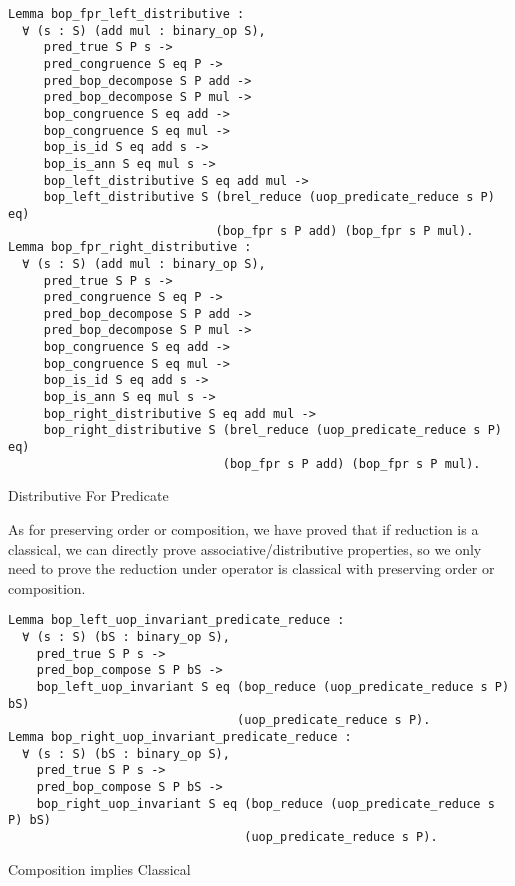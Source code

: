 \begin{listing}[H]
\begin{verbatim}
Lemma bop_fpr_left_distributive :
  ∀ (s : S) (add mul : binary_op S),
     pred_true S P s -> 
     pred_congruence S eq P ->
     pred_bop_decompose S P add ->
     pred_bop_decompose S P mul ->          
     bop_congruence S eq add ->     
     bop_congruence S eq mul -> 
     bop_is_id S eq add s ->     
     bop_is_ann S eq mul s ->
     bop_left_distributive S eq add mul ->
     bop_left_distributive S (brel_reduce (uop_predicate_reduce s P) eq) 
                             (bop_fpr s P add) (bop_fpr s P mul).
Lemma bop_fpr_right_distributive :
  ∀ (s : S) (add mul : binary_op S),
     pred_true S P s -> 
     pred_congruence S eq P ->
     pred_bop_decompose S P add ->
     pred_bop_decompose S P mul ->          
     bop_congruence S eq add ->     
     bop_congruence S eq mul -> 
     bop_is_id S eq add s ->     
     bop_is_ann S eq mul s ->
     bop_right_distributive S eq add mul ->
     bop_right_distributive S (brel_reduce (uop_predicate_reduce s P) eq) 
                              (bop_fpr s P add) (bop_fpr s P mul).
\end{verbatim}
\caption{Distributive For Predicate} 
\label{coq:proof:predicate_distributive}
\end{listing}
As for preserving order or composition, we have proved that if reduction is a classical, we can directly prove associative/distributive properties, so we only need to prove the reduction under operator is classical with preserving order or composition.
\begin{listing}[H]
\begin{verbatim}
Lemma bop_left_uop_invariant_predicate_reduce :
  ∀ (s : S) (bS : binary_op S),
    pred_true S P s -> 
    pred_bop_compose S P bS ->
    bop_left_uop_invariant S eq (bop_reduce (uop_predicate_reduce s P) bS) 
                                (uop_predicate_reduce s P).
Lemma bop_right_uop_invariant_predicate_reduce :
  ∀ (s : S) (bS : binary_op S),
    pred_true S P s -> 
    pred_bop_compose S P bS ->    
    bop_right_uop_invariant S eq (bop_reduce (uop_predicate_reduce s P) bS) 
                                 (uop_predicate_reduce s P).
\end{verbatim}
\caption{Composition implies Classical} 
\label{coq:proof:composition_classic}
\end{listing}

